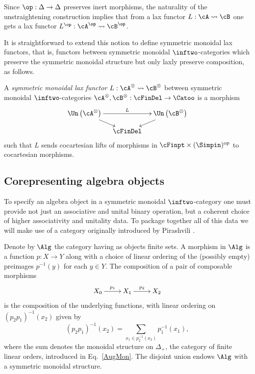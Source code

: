 \documentclass[a4paper]{article}
\numberwithin{equation}{section}
\begin{document}
\begin{remark}
 \label{laxop}
 Since $\op:\Delta \to \Delta$ preserves inert morphisms, the naturality of the unstraightening construction implies that from a lax functor $L: \cA \rightsquigarrow \cB$ one gets a lax functor $L^\op: \cA^\op \rightsquigarrow \cB^\op$.
\end{remark}


It is straightforward to extend this notion to define symmetric monoidal lax functors, that is, functors between symmetric monoidal $\inftwo$-categories which preserve the symmetric monoidal structure but only laxly preserve composition, as follows.
\begin{defn}
\label{DefnsmLax}
 A {\em symmetric monoidal lax functor} $L: \cA^\otimes \rightsquigarrow \cB^\otimes$ between symmetric monoidal $\inftwo$-categories $\cA^\otimes, \cB^\otimes: \cFinDel \to \Catoo$ is a morphism
 \begin{equation*}
  \xymatrixrowsep{.8pc}\xymatrixcolsep{.9pc}\xymatrix{\Un\left(\cA^\otimes\right)\ar[rr]^{L} \ar[rd] & & \Un\left(\cB^\otimes\right) \ar[ld] \\
  & \cFinDel & }
 \end{equation*}
 such that $L$ sends cocartesian lifts of morphisms in $\cFinpt\times(\Simpin)^{\rm op}$ to cocartesian morphisms.
\end{defn}



\subsection{Corepresenting algebra objects}
\label{Sec:algprop}
To specify an algebra object in a symmetric monoidal $\inftwo$-category one must provide not just an associative and unital binary operation, but a coherent choice of higher associativity and unitality data. To package together all of this data we will make use of a category originally introduced by Pirashvili \cite{Pirash02}.

Denote by $\Alg$ the category having as objects finite sets. A morphism in $\Alg$ is a function $p:X \to Y$ along with a choice of linear ordering of the (possibly empty) preimages $p^{-1}(y)$ for each $y \in Y$. The composition of a pair of composable morphisms
\begin{equation*}
 \xymatrix{ X_0 \ar[r]^-{p_1} & X_1 \ar[r]^-{p_2} & X_2}
\end{equation*}
is the composition of the underlying functions, with linear ordering on $(p_2p_1)^{-1}(x_2)$ given by
\begin{equation*}
 (p_2p_1)^{-1}(x_2) = \sum_{x_1 \in p_2^{-1}(x_2)} p_1^{-1}(x_1),
\end{equation*}
where the sum denotes the monoidal structure on $\Delta_+$, the category of finite linear orders, introduced in Eq.~\ref{AugMon}. The disjoint union endows $\Alg$ with a symmetric monoidal structure.
\end{document}
